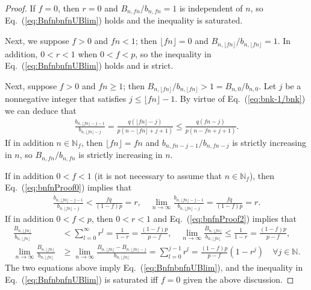 \documentclass[aop]{imsart}
\theoremstyle{plain}
\theoremstyle{remark}
\newcommand{\bbN}{\mathbb{N}}
\newcommand{\1}{\operatorname{\uppercase\expandafter{\romannumeral1}}}
\newcommand{\2}{\operatorname{\uppercase\expandafter{\romannumeral2}}}
\newcommand{\3}{\operatorname{\uppercase\expandafter{\romannumeral3}}}
\newcommand{\4}{\operatorname{\uppercase\expandafter{\romannumeral4}}}
\newcommand{\5}{\operatorname{\uppercase\expandafter{\romannumeral5}}}
\newcommand{\6}{\operatorname{\uppercase\expandafter{\romannumeral6}}}
\newcommand{\7}{\operatorname{\uppercase\expandafter{\romannumeral7}}}
\newcommand{\8}{\operatorname{\uppercase\expandafter{\romannumeral8}}}
\newcommand{\9}{\operatorname{\uppercase\expandafter{\romannumeral9}}}
\newcommand{\eref}[1]{Eq.~\textup{(\ref{#1})}}
\begin{document}
\begin{proof}
	If $f=0$, then $r=0$ and $B_{n,fn}/b_{n,fn}=1$  is independent of $n$, so  \eref{eq:BnfnbnfnUBlim} holds and the inequality is saturated.
	
Next, we suppose $f>0$ and  $fn<1$; then $\lfloor fn\rfloor=0$ and  $B_{n,\lfloor fn\rfloor}/b_{n,\lfloor fn\rfloor}=1$. In addition, $0<r<1$ when  $0<f<p$, so the inequality in \eref{eq:BnfnbnfnUBlim} holds and is strict. 




Next, suppose $f>0$ and  $fn\geq1$; then $B_{n,\lfloor fn\rfloor}/b_{n,\lfloor fn\rfloor}>1=B_{n,0}/b_{n,0}$. 
Let $j$ be a nonnegative integer that satisfies $j\leq \lfloor fn\rfloor-1$. By virtue of  \eref{eq:bnk-1/bnk} we can deduce that	
\begin{gather}
\frac{b_{n,\lfloor fn\rfloor-j-1}}{b_{n,\lfloor fn\rfloor-j}}=\frac{q (\lfloor fn\rfloor-j)}{p(n-\lfloor fn\rfloor+j+1)}\leq \frac{q (fn-j)}{p(n-fn+j+1)}. \label{eq:bnfnProof0}
\end{gather}
If in addition $n\in \bbN_f$, then 	$\lfloor fn\rfloor=fn$ and
$b_{n,fn-j-1}/b_{n,fn-j}$ is strictly increasing in $n$, so $B_{n,fn}/b_{n,fn}$ is strictly increasing in $n$.

If in addition $0<f<1$ (it is not necessary to assume that $n\in \bbN_f$), then \eref{eq:bnfnProof0} implies that 
\begin{gather}
\frac{b_{n,\lfloor fn\rfloor-j-1}}{b_{n,\lfloor fn\rfloor-j}}<\frac{fq}{(1-f)p}=r,  \quad 
\lim_{n\to \infty} \frac{b_{n,\lfloor fn\rfloor-j-1}}{b_{n,\lfloor fn\rfloor-j}}=\frac{fq}{(1-f)p}=r. \label{eq:bnfnProof2}
\end{gather}	
If in addition  $0<f<p$, then $0<r<1$ and \eref{eq:bnfnProof2} implies that
\begin{align} 
\frac{B_{n,\lfloor fn\rfloor}}{b_{n,\lfloor fn\rfloor}}&< \sum_{l=0}^{\infty}r^l=\frac{1}{1-r}=\frac{(1-f)p}{p-f},\quad 
\lim_{n\to \infty} \frac{B_{n,\lfloor fn\rfloor}}{b_{n,\lfloor fn\rfloor}}\leq \frac{1}{1-r}= \frac{(1-f)p}{p-f},\\
\lim_{n\to \infty} \frac{B_{n,\lfloor fn\rfloor}}{b_{n,\lfloor fn\rfloor}}&\geq 
\lim_{n\to \infty} \frac{B_{n,\lfloor fn\rfloor}-B_{n,\lfloor fn\rfloor-j}}{b_{n,\lfloor fn\rfloor}}=\sum_{l=0}^{j-1}r^l=\frac{(1-f)p}{p-f}(1-r^j)\quad \forall j\in \bbN.
\end{align}
The two equations above imply \eref{eq:BnfnbnfnUBlim}, and the inequality in \eref{eq:BnfnbnfnUBlim} is saturated iff $f=0$ given the above discussion.
\end{proof}
 
\end{document}
